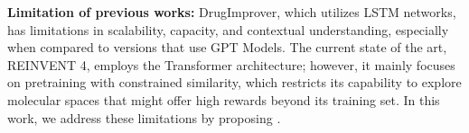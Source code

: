 \textbf{Limitation of previous works:} 
DrugImprover, which utilizes LSTM networks, has limitations in scalability, capacity, and contextual understanding, especially when compared to versions that use GPT Models. 
The current state of the art, REINVENT 4, employs the Transformer architecture; however, {it mainly focuses on pretraining with constrained similarity, which restricts its capability to explore molecular spaces that might offer high rewards beyond its training set.}
In this work, we address these limitations by proposing \algname. 





